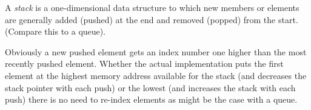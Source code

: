\documentclass[12pt]{article}
\begin{document}
A \emph{stack} is a one-dimensional data structure to which new members or elements are generally added (pushed) at the end and removed (popped) from the start. (Compare this to a queue).

Obviously a new pushed element gets an index number one higher than the most recently pushed element. Whether the actual implementation puts the first element at the highest memory address available for the stack (and decreases the stack pointer with each push) or the lowest (and increases the stack with each push) there is no need to re-index elements as might be the case with a queue.
\end{document}
